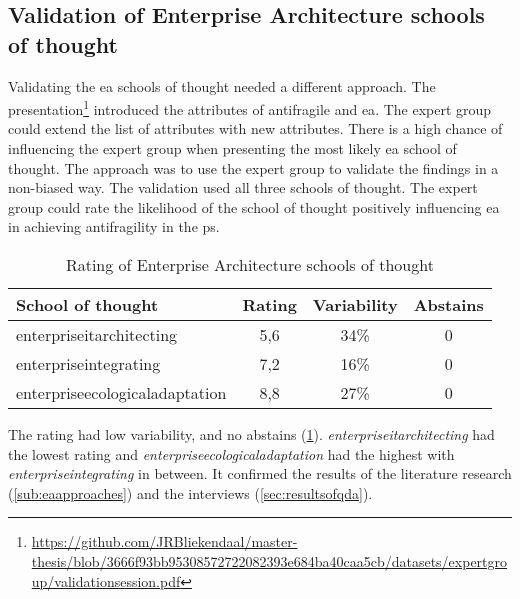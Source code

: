 \subsection{Validation of Enterprise Architecture schools of thought}
\label{sub:validationofeaschools}
Validating the \acrlong{ea} schools of thought needed a different approach. The presentation\footnote{\url{https://github.com/JRBliekendaal/master-thesis/blob/3666f93bb95308572722082393e684ba40caa5cb/datasets/expertgroup/validationsession.pdf}} introduced the attributes of \gls{antifragile} and \acrshort{ea}. The expert group could extend the list of \glspl{attribute} with new \glspl{attribute}. There is a high chance of influencing the expert group when presenting the most likely \acrlong{ea} school of thought. The approach was to use the expert group to validate the findings in a non-biased way. The validation used all three schools of thought. The expert group could rate the likelihood of the school of thought positively influencing \acrlong{ea} in achieving \gls{antifragility} in the \gls{ps}. 
\begin{table}[H]
	\centering
	\begin{tabular}{p{}ccc}
		\toprule
		\textbf{School of thought} & \textbf{Rating} & \textbf{Variability} & \textbf{Abstains} \\
		\midrule%
		\Gls{enterpriseitarchitecting} & 5,6   & 34\%  & 0 \\
		\Gls{enterpriseintegrating} & 7,2   & 16\%  & 0 \\
		\Gls{enterpriseecologicaladaptation} & 8,8   & 27\%  & 0 \\
		\bottomrule%
	\end{tabular}%
	\caption[Rating of Enterprise Architecture schools of thought]{Rating of Enterprise Architecture schools of thought}
	\label{tab:validationgscoreeaschools}
\end{table}%
The rating had low variability, and no abstains (\cref{tab:validationgscoreeaschools}). \textit{\textit{\gls{enterpriseitarchitecting}}} had the lowest rating and \textit{\textit{\gls{enterpriseecologicaladaptation}}} had the highest with \textit{\textit{\gls{enterpriseintegrating}}} in between. It confirmed the results of the literature research (\cref{sub:eaapproaches}) and the interviews (\cref{sec:resultsofqda}).

